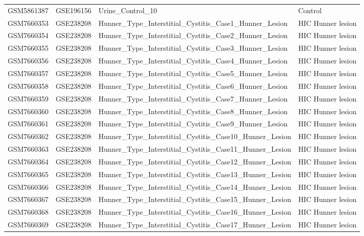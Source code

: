 \begin{longtable}{llp{}l}
GSM5861387 & GSE196156 & Urine\_Control\_10 & Control \\
GSM7660353 & GSE238208 & Hunner\_Type\_Interstitial\_Cystitis\_Case1\_Hunner\_Lesion & HIC Hunner lesion \\
GSM7660354 & GSE238208 & Hunner\_Type\_Interstitial\_Cystitis\_Case2\_Hunner\_Lesion & HIC Hunner lesion \\
GSM7660355 & GSE238208 & Hunner\_Type\_Interstitial\_Cystitis\_Case3\_Hunner\_Lesion & HIC Hunner lesion \\
GSM7660356 & GSE238208 & Hunner\_Type\_Interstitial\_Cystitis\_Case4\_Hunner\_Lesion & HIC Hunner lesion \\
GSM7660357 & GSE238208 & Hunner\_Type\_Interstitial\_Cystitis\_Case5\_Hunner\_Lesion & HIC Hunner lesion \\
GSM7660358 & GSE238208 & Hunner\_Type\_Interstitial\_Cystitis\_Case6\_Hunner\_Lesion & HIC Hunner lesion \\
GSM7660359 & GSE238208 & Hunner\_Type\_Interstitial\_Cystitis\_Case7\_Hunner\_Lesion & HIC Hunner lesion \\
GSM7660360 & GSE238208 & Hunner\_Type\_Interstitial\_Cystitis\_Case8\_Hunner\_Lesion & HIC Hunner lesion \\
GSM7660361 & GSE238208 & Hunner\_Type\_Interstitial\_Cystitis\_Case9\_Hunner\_Lesion & HIC Hunner lesion \\
GSM7660362 & GSE238208 & Hunner\_Type\_Interstitial\_Cystitis\_Case10\_Hunner\_Lesion & HIC Hunner lesion \\
GSM7660363 & GSE238208 & Hunner\_Type\_Interstitial\_Cystitis\_Case11\_Hunner\_Lesion & HIC Hunner lesion \\
GSM7660364 & GSE238208 & Hunner\_Type\_Interstitial\_Cystitis\_Case12\_Hunner\_Lesion & HIC Hunner lesion \\
GSM7660365 & GSE238208 & Hunner\_Type\_Interstitial\_Cystitis\_Case13\_Hunner\_Lesion & HIC Hunner lesion \\
GSM7660366 & GSE238208 & Hunner\_Type\_Interstitial\_Cystitis\_Case14\_Hunner\_Lesion & HIC Hunner lesion \\
GSM7660367 & GSE238208 & Hunner\_Type\_Interstitial\_Cystitis\_Case15\_Hunner\_Lesion & HIC Hunner lesion \\
GSM7660368 & GSE238208 & Hunner\_Type\_Interstitial\_Cystitis\_Case16\_Hunner\_Lesion & HIC Hunner lesion \\
GSM7660369 & GSE238208 & Hunner\_Type\_Interstitial\_Cystitis\_Case17\_Hunner\_Lesion & HIC Hunner lesion \\

\end{longtable}
